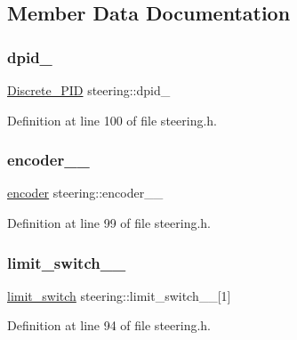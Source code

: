\subsection{Member Data Documentation}
\mbox{\label{classsteering_aa5188aeac7c2173f1663aacd830b088c}} 
\subsubsection{\texorpdfstring{dpid\_}{dpid\_}}
{\footnotesize\ttfamily \mbox{\hyperlink{class_discrete___p_i_d}{Discrete\+\_\+\+P\+ID}} steering\+::dpid\+\_\+\hspace{0.3cm}{\ttfamily [private]}}



Definition at line 100 of file steering.\+h.

\mbox{\label{classsteering_a59f627a3b0b3cbb4ee083c3233ea6640}} 
\subsubsection{\texorpdfstring{encoder\_\_}{encoder\_\_}}
{\footnotesize\ttfamily \mbox{\hyperlink{classencoder}{encoder}} steering\+::encoder\+\_\+\+\_\+\hspace{0.3cm}{\ttfamily [private]}}



Definition at line 99 of file steering.\+h.

\mbox{\label{classsteering_a8f20b7cbd6755817c0ac42370d91d173}} 
\subsubsection{\texorpdfstring{limit\_switch\_\_}{limit\_switch\_\_}}
{\footnotesize\ttfamily \mbox{\hyperlink{structlimit__switch}{limit\+\_\+switch}} steering\+::limit\+\_\+switch\+\_\+\+\_\+\mbox{[}1\mbox{]}}



Definition at line 94 of file steering.\+h.

\mbox{\label{classsteering_ae6f1468c34059bfeecec645f6a51971a}} 
